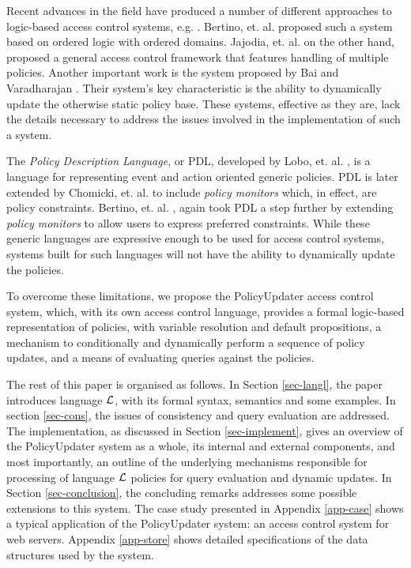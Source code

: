 \documentclass[11pt, twocolumn]{article}
\begin{document}
    Recent advances in the field have produced a number of different approaches
    to logic-based access control systems, e.g. \cite{HAL,LI}. Bertino, et. al.
    \cite{BE1} proposed such a system based on ordered logic with ordered
    domains. Jajodia, et. al. \cite{JAJ} on the other hand, proposed a general
    access control framework that features handling of multiple policies.
    Another important work is the system proposed by Bai and Varadharajan
    \cite{BA1,BA2}. Their system's key characteristic is the ability to
    dynamically update the otherwise static policy base. These systems,
    effective as they are, lack the details necessary to address the issues
    involved in the implementation of such a system.

    The {\em Policy Description Language}, or PDL, developed by Lobo,
    et. al. \cite{LOB}, is a language for representing event and action
    oriented generic policies. PDL is later extended by Chomicki, et. al.
    \cite{CHO} to include {\em policy monitors} which, in effect, are policy
    constraints. Bertino, et. al. \cite{BE2}, again took PDL a step further by
    extending {\em policy monitors} to allow users to express preferred
    constraints. While these generic languages are expressive enough to be used
    for access control systems, systems built for such languages will not have
    the ability to dynamically update the policies.

    To overcome these limitations, we propose the PolicyUpdater access control
    system, which, with its own access control language, provides a formal
    logic-based representation of policies, with variable resolution and
    default propositions, a mechanism to conditionally and dynamically
    perform a sequence of policy updates, and a means of evaluating queries
    against the policies.

    The rest of this paper is organised as follows. In Section \ref{sec-langl},
    the paper introduces language ${\cal L}$, with its formal syntax, semantics
    and some examples. In section \ref{sec-cons}, the issues of consistency and
    query evaluation are addressed. The implementation, as discussed in Section
    \ref{sec-implement}, gives an overview of the PolicyUpdater system as
    a whole, its internal and external components, and most importantly, an
    outline of the underlying mechanisms responsible for processing of language
    ${\cal L}$ policies for query evaluation and dynamic updates. In Section
    \ref{sec-conclusion}, the concluding remarks addresses some possible 
    extensions to this system. The case study presented in Appendix
    \ref{app-case} shows a typical application of the PolicyUpdater system: an
    access control system for web servers. Appendix \ref{app-store} shows
    detailed specifications of the data structures used by the system.
\end{document}
